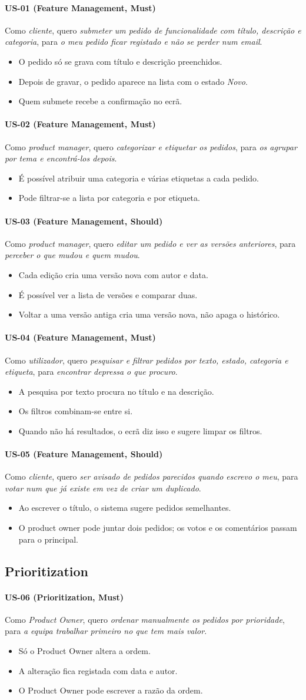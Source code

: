 \documentclass[12pt,a4paper]{article}
\newcommand{\us}[7]{%
  \paragraph{#1 \textnormal{(#2, #6)}}
  Como \textit{#3}, quero \textit{#4}, para \textit{#5}.
  \begin{itemize}
  #7
  \end{itemize}
}
\begin{document}
\us{US-01}{Feature Management}{cliente}{submeter um pedido de funcionalidade com título, descrição e categoria}{o meu pedido ficar registado e não se perder num email}{Must}{
\item O pedido só se grava com título e descrição preenchidos.
\item Depois de gravar, o pedido aparece na lista com o estado \textit{Novo}.
\item Quem submete recebe a confirmação no ecrã.}

\us{US-02}{Feature Management}{product manager}{categorizar e etiquetar os pedidos}{os agrupar por tema e encontrá-los depois}{Must}{
\item É possível atribuir uma categoria e várias etiquetas a cada pedido.
\item Pode filtrar-se a lista por categoria e por etiqueta.}

\us{US-03}{Feature Management}{product manager}{editar um pedido e ver as versões anteriores}{perceber o que mudou e quem mudou}{Should}{
\item Cada edição cria uma versão nova com autor e data.
\item É possível ver a lista de versões e comparar duas.
\item Voltar a uma versão antiga cria uma versão nova, não apaga o histórico.}

\us{US-04}{Feature Management}{utilizador}{pesquisar e filtrar pedidos por texto, estado, categoria e etiqueta}{encontrar depressa o que procuro}{Must}{
\item A pesquisa por texto procura no título e na descrição.
\item Os filtros combinam-se entre si.
\item Quando não há resultados, o ecrã diz isso e sugere limpar os filtros.}

\us{US-05}{Feature Management}{cliente}{ser avisado de pedidos parecidos quando escrevo o meu}{votar num que já existe em vez de criar um duplicado}{Should}{
\item Ao escrever o título, o sistema sugere pedidos semelhantes.
\item O product owner pode juntar dois pedidos; os votos e os comentários passam para o principal.}

\subsection{Prioritization}

\us{US-06}{Prioritization}{Product Owner}{ordenar manualmente os pedidos por prioridade}{a equipa trabalhar primeiro no que tem mais valor}{Must}{
\item Só o Product Owner altera a ordem.
\item A alteração fica registada com data e autor.
\item O Product Owner pode escrever a razão da ordem.}
\end{document}
